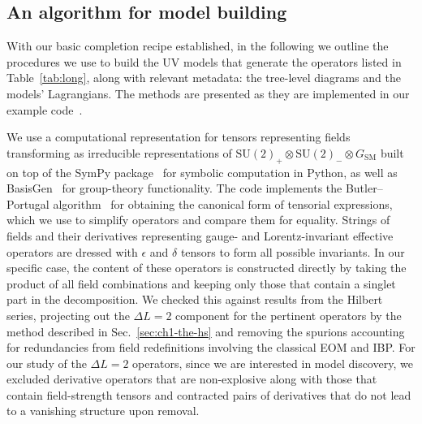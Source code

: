 \subsection{An algorithm for model building}
\label{sec:ch2-algorithm}

With our basic completion recipe established, in the following we outline the
procedures we use to build the UV models that generate the operators listed in
Table~\ref{tab:long}, along with relevant metadata: the tree-level diagrams and
the models' Lagrangians. The methods are presented as they are implemented in
our example code~\cite{neutrinomass2020}.

We use a computational representation for tensors representing fields
transforming as irreducible representations of
$\mathrm{SU}(2)_{+} \otimes \mathrm{SU}(2)_{-} \otimes G_{\text{SM}}$ built on
top of the \textsf{SymPy} package~\cite{10.7717/peerj-cs.103} for symbolic
computation in \textsf{Python}, as well as
\textsf{BasisGen}~\cite{Criado:2019ugp} for group-theory functionality. The code
implements the Butler--Portugal algorithm~\cite{butler1991, MANSSUR_2002} for
obtaining the canonical form of tensorial expressions, which we use to simplify
operators and compare them for equality. Strings of fields and their derivatives
representing gauge- and Lorentz-invariant effective operators are dressed with
$\epsilon$ and $\delta$ tensors to form all possible invariants. In our specific
case, the content of these operators is constructed directly by taking the
product of all field combinations and keeping only those that contain a singlet
part in the decomposition. We checked this against results from the Hilbert
series, projecting out the $\Delta L = 2$ component for the pertinent operators by the method described in Sec.~\ref{sec:ch1-the-hs}
and removing the spurions accounting for redundancies from field redefinitions
involving the classical EOM and IBP. For our study of the $\Delta L = 2$
operators, since we are interested in model discovery, we excluded derivative
operators that are non-explosive along with those that contain field-strength
tensors and contracted pairs of derivatives that do not lead to a vanishing
structure upon removal.


